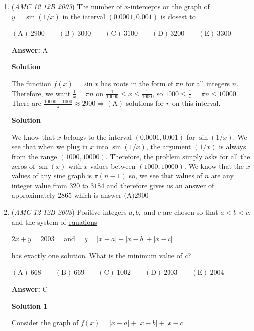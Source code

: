 \begin{enumerate}
 


	\item (\textit{AMC 12 12B 2003}) The number of $x$-intercepts on the graph of $y=\sin(1/x)$ in the interval $(0.0001,0.001)$ is closest to


 $\mathrm{(A)}\ 2900 \qquad\mathrm{(B)}\ 3000 \qquad\mathrm{(C)}\ 3100 \qquad\mathrm{(D)}\ 3200 \qquad\mathrm{(E)}\ 3300$

 \textbf{Answer: }A



\textbf{Solution}

The function $f(x) = \sin x$ has roots in the form of $\pi n$ for all integers $n$. Therefore, we want $\frac{1}{x} = \pi n$ on $\frac{1}{10000} \le x \le \frac{1}{1000}$, so $1000 \le \frac 1x = \pi n \le 10000$. There are $\frac{10000-1000}{\pi} \approx \boxed{2900} \Rightarrow \mathrm{(A)}$ solutions for $n$ on this interval. 

 



\textbf{Solution}

We know that $x$ belongs to the interval $(0.0001,0.001)$ for $\sin(1/x)$. We see that when we plug in $x$ into $\sin(1/x)$, the argument $(1/x)$ is always from the range $(1000, 10000)$. Therefore, the problem simply asks for all the zeros of $\sin(x)$ with $x$ values between $(1000, 10000)$. We know that the $x$ values of any sine graph is $\pi(n-1)$ so, we see that values of $n$ are any integer value from $320$ to $3184$ and therefore gives us an answer of approximately $2865$ which is answer $\boxed{\text{(A)} 2900}$



	\item (\textit{AMC 12 12B 2003}) Positive integers $a,b,$ and $c$ are chosen so that $a<b<c$, and the system of \href{https://artofproblemsolving.com/wiki/index.php?title=Equation}{equations}


 $2x + y = 2003 \quad$ and $\quad y = |x-a| + |x-b| + |x-c|$

 has exactly one solution. What is the minimum value of $c$?


 $\mathrm{(A)}\ 668 \qquad\mathrm{(B)}\ 669 \qquad\mathrm{(C)}\ 1002 \qquad\mathrm{(D)}\ 2003 \qquad\mathrm{(E)}\ 2004$

 \textbf{Answer: }C



\textbf{Solution 1}

Consider the graph of $f(x)=|x-a|+|x-b|+|x-c|$.


\end{enumerate}
